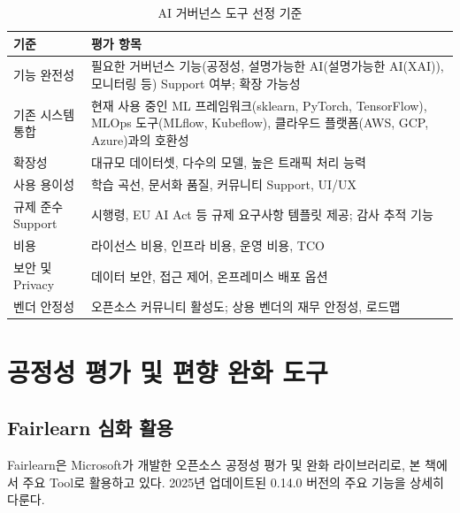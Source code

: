 \begin{table}[htbp]
\centering
\caption{AI 거버넌스 도구 선정 기준}
\label{tab:tool_selection_criteria}
\begin{tabularx}{\textwidth}{p{3cm}X}
\toprule
\textbf{기준} & \textbf{평가 항목} \\
\midrule
기능 완전성 & 
필요한 거버넌스 기능(공정성, 설명가능한 AI(설명가능한 AI(XAI)), 모니터링 등) Support 여부; 
확장 가능성 \\
\midrule
기존 시스템 통합 & 
현재 사용 중인 ML 프레임워크(sklearn, PyTorch, TensorFlow), 
MLOps 도구(MLflow, Kubeflow), 
클라우드 플랫폼(AWS, GCP, Azure)과의 호환성 \\
\midrule
확장성 & 
대규모 데이터셋, 다수의 모델, 높은 트래픽 처리 능력 \\
\midrule
사용 용이성 & 
학습 곡선, 문서화 품질, 커뮤니티 Support, UI/UX \\
\midrule
규제 준수 Support & 
시행령, EU AI Act 등 규제 요구사항 템플릿 제공; 
감사 추적 기능 \\
\midrule
비용 & 
라이선스 비용, 인프라 비용, 운영 비용, TCO \\
\midrule
보안 및 Privacy & 
데이터 보안, 접근 제어, 온프레미스 배포 옵션 \\
\midrule
벤더 안정성 & 
오픈소스 커뮤니티 활성도; 상용 벤더의 재무 안정성, 로드맵 \\
\bottomrule
\end{tabularx}
\end{table}

\section{공정성 평가 및 편향 완화 도구}
\label{sec:6.2}

\subsection{Fairlearn 심화 활용}
\label{sec:6.2.1}

Fairlearn은 Microsoft가 개발한 오픈소스 공정성 평가 및 완화 라이브러리로, 
본 책에서 주요 Tool로 활용하고 있다. 
2025년 업데이트된 0.14.0 버전의 주요 기능을 상세히 다룬다.

